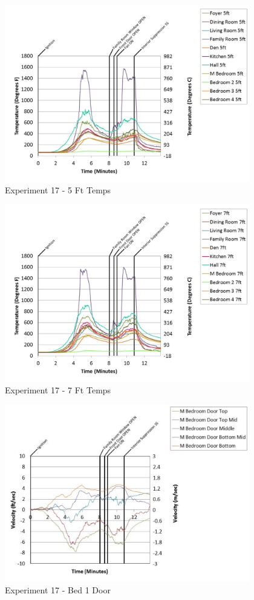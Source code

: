 \documentclass{article}
\begin{document}
\begin{appendices}
	\begin{figure}[h!]
		\centering
		\includegraphics[height=3.05in]{0_Images/Results_Charts/Exp_17_Charts/5FtTemps.pdf}
		\caption{Experiment 17 - 5 Ft Temps}
	\end{figure}
 

	\begin{figure}[h!]
		\centering
		\includegraphics[height=3.05in]{0_Images/Results_Charts/Exp_17_Charts/7FtTemps.pdf}
		\caption{Experiment 17 - 7 Ft Temps}
	\end{figure}
 
	\clearpage

	\begin{figure}[h!]
		\centering
		\includegraphics[height=3.05in]{0_Images/Results_Charts/Exp_17_Charts/Bed1Door.pdf}
		\caption{Experiment 17 - Bed 1 Door}
	\end{figure}
 


\end{appendices}
\end{document}
